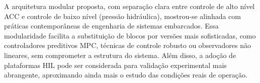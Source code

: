 A arquitetura modular proposta, com separação clara entre controle de alto nível ACC e controle de baixo nível (pressão hidráulica), mostrou-se alinhada com práticas contemporâneas de engenharia de sistemas embarcados. Essa modularidade facilita a substituição de blocos por versões mais sofisticadas, como controladores preditivos MPC, técnicas de controle robusto ou observadores não lineares, sem comprometer a estrutura do sistema. Além disso, a adoção de plataformas HIL pode ser considerada para validação experimental mais abrangente, aproximando ainda mais o estudo das condições reais de operação.

